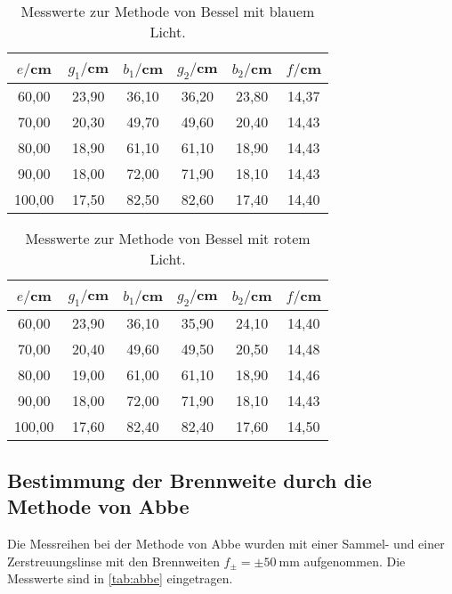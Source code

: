 \begin{table}[htp]
	\begin{center}
    \caption{Messwerte zur Methode von Bessel mit blauem Licht.}
    \label{tab:besselblau}
		\begin{tabular}{cccccc}
		\toprule
			{$e/$cm} & {$g_1/$cm} & {$b_1/$cm} & {$g_2/$cm} & {$b_2/$cm} & {$f/$cm}\\
			\midrule
			60,00 & 23,90 & 36,10 & 36,20 & 23,80 & 14,37\\
			70,00 & 20,30 & 49,70 & 49,60 & 20,40 & 14,43\\
			80,00 & 18,90 & 61,10 & 61,10 & 18,90 & 14,43\\
			90,00 & 18,00 & 72,00 & 71,90 & 18,10 & 14,43\\
		  100,00 & 17,50 & 82,50 & 82,60 & 17,40 & 14,40\\
		\bottomrule
		\end{tabular}
	\end{center}
\end{table}

\begin{table}[htp]
	\begin{center}
    \caption{Messwerte zur Methode von Bessel mit rotem Licht.}
    \label{tab:besselrot}
		\begin{tabular}{cccccc}
		\toprule
			{$e/$cm} & {$g_1/$cm} & {$b_1/$cm} & {$g_2/$cm} & {$b_2/$cm} & {$f/$cm}\\
			\midrule
			60,00 & 23,90 & 36,10 & 35,90 & 24,10 & 14,40\\
			70,00 & 20,40 & 49,60 & 49,50 & 20,50 & 14,48\\
			80,00 & 19,00 & 61,00 & 61,10 & 18,90 & 14,46\\
			90,00 & 18,00 & 72,00 & 71,90 & 18,10 & 14,43\\
			100,00 & 17,60 & 82,40 & 82,40 & 17,60 & 14,50\\
		\bottomrule
		\end{tabular}
	\end{center}
\end{table}


\subsection{Bestimmung der Brennweite durch die Methode von Abbe}
Die Messreihen bei der Methode von Abbe wurden mit einer Sammel- und einer
Zerstreuungslinse mit den Brennweiten $f_{\pm} = \pm \SI{50}{\mm}$ aufgenommen.
Die Messwerte sind in \ref{tab:abbe} eingetragen.

